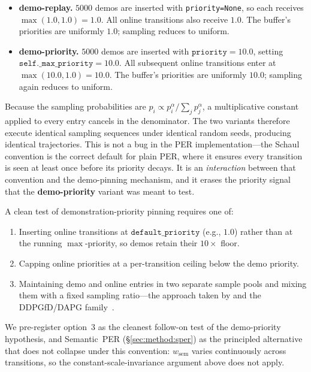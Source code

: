 \begin{itemize}\itemsep0pt
  \item \textbf{demo-replay.} $5000$ demos are inserted with
        \texttt{priority=None}, so each receives
        $\max(1.0, 1.0) = 1.0$. All online transitions also receive
        $1.0$. The buffer's priorities are uniformly $1.0$; sampling
        reduces to uniform.
  \item \textbf{demo-priority.} $5000$ demos are inserted with
        $\texttt{priority}=10.0$, setting
        $\texttt{self.\_max\_priority}=10.0$. All subsequent online
        transitions enter at $\max(10.0, 1.0) = 10.0$. The buffer's
        priorities are uniformly $10.0$; sampling again reduces to
        uniform.
\end{itemize}

Because the sampling probabilities are
$p_i \!\propto\! p_i^\alpha / \sum_j p_j^\alpha$, a multiplicative
constant applied to every entry cancels in the denominator. The two
variants therefore execute identical sampling sequences under
identical random seeds, producing identical trajectories. This is
not a bug in the PER implementation---the Schaul convention is the
correct default for plain PER, where it ensures every transition is
seen at least once before its priority decays. It is an
\emph{interaction} between that convention and the demo-pinning
mechanism, and it erases the priority signal that the
\textbf{demo-priority} variant was meant to test.

A clean test of demonstration-priority pinning requires one of:
\begin{enumerate}\itemsep0pt
  \item Inserting online transitions at $\texttt{default\_priority}$
        (e.g., $1.0$) rather than at the running $\max$-priority, so
        demos retain their $10\times$ floor.
  \item Capping online priorities at a per-transition ceiling below
        the demo priority.
  \item Maintaining demo and online entries in two separate sample
        pools and mixing them with a fixed sampling
        ratio---the approach taken by
        \citet{nair2018overcomingexploration} and the DDPGfD/DAPG
        family~\citep{vecerik2017ddpgfd,rajeswaran2017dapg}.
\end{enumerate}
We pre-register option~3 as the cleanest follow-on test of the
demo-priority hypothesis, and Semantic~PER
(\S\ref{sec:method:sper}) as the principled alternative that does
not collapse under this convention: $w_{\text{sem}}$ varies
continuously across transitions, so the
constant-scale-invariance argument above does not apply.

